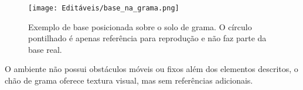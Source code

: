 {\begin{figure}[H]
    \centering
    \texttt{[image: Editáveis/base\_na\_grama.png]}
    \caption{\color{red}Exemplo de base posicionada sobre o solo de grama. O círculo pontilhado é apenas referência para reprodução e não faz parte da base real.}
    \label{fig:base_exemplo}
\end{figure}

O ambiente não possui obstáculos móveis ou fixos além dos elementos descritos, o chão de grama oferece textura visual, mas sem referências adicionais.
}